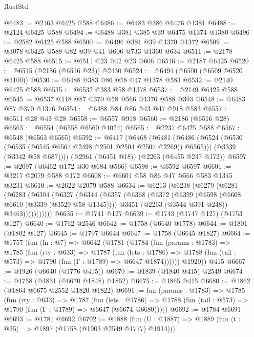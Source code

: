 \begin{lexlean}{RustStd}
\begin{coremodule}
{\begin{coremodule}
{{{{{{{{{{{{{{{@6483 := @2163 @6425 @588
@6486 := @6483 @386 @6476 @1381
@6488 := @2124 @6425 @588
@6494 := @6488 @381 @385 @39 @6475 @1374 @1380
@6496 := @2582 @6425 @588
@6500 := @6496 @381 @39 @1370 @1372
@6509 := @3078 @6425 @588 @82 @39 @41 @606 @733 @1360 @634
@6511 := @2178 @6425 @588
@6515 := @6511 @23 @42 @23 @606
@6516 := @2187 @6425
@6520 := @6515 (@2186 (@6516 @23)) @2430
@6524 := @6494 (@6500 (@6509 @6520 @3100))
@6530 := @6488 @383 @86 @58 @47 @1378 @583
@6532 := @2140 @6425 @588
@6535 := @6532 @383 @58 @1378
@6537 := @2149 @6425 @588
@6545 := @6537 @118 @87 @370 @58 @566 @1376 @588 @393
@6548 := @6483 @87 @370 @1376
@6554 := @6488 @84 @86 @43 @47 @918 @583
@6557 := @6511 @28 @43 @28
@6558 := @6557 @918
@6560 := @2186 (@6516 @28)
@6563 := @6554 (@6558 @6560 @4024)
@6565 := @2237 @6425 @588
@6567 := @6548 (@6563 @6565)
@6592 := @6417
    (@6468
      (@6481
        (@6486 (@6524 (@6530 (@6535 (@6545 @6567 @2498 @2501 @2504 @2507 @2269)) @6565)))
        (@3339 (@3342 @58 @687))))
    (@2961 (@6451 @18))
    (@2263 (@6455 @247 @172))
@6597 := @2097 (@6462 @172 @30 @684 @566)
@6598 := @6592 @6597
@6601 := @3217 @2079 @588 @172
@6608 := @6601 @58 @86 @47 @566 @583 @1345 @3231
@6610 := @2622 @2079 @588
@6634 := @6213
    (@6238
      (@6279
        (@6281
          (@6283
            (@6304
              (@6327
                (@6344
                  (@6357
                    (@6368
                      (@6372
                        (@6399
                          (@6598 (@6608 @6610 (@3339 (@3529 @58 @1345))))
                          @3451
                          (@2263 (@3544 @391 @248))
                          @3463)))))))))))
@6635 := @1741 @127
@6639 := @1743 (@1747 @127) (@1753 @127)
@6640 := @1762 @2546
@6642 := @1758 (@6640 @1778)
@6644 := @1801 (@1802 @127)
@6645 := @1797 @6644
@6647 := @1758 (@6645 @1827)
@6664 := @1757
    (fun (fn : @7) =>
    @6642
      (@1781
        (@1784
          (fun (params : @1783) =>
          @1785
            (fun (rty : @633) =>
            @1787
              (fun (lets : @1786) =>
              @1788 (fun (tail : @573) => @1790 (fun (Γ : @1789) => @6647 @1874))))))
        @1920))
    @415
@6667 := @1926 (@6640 (@1776 @415))
@6670 := @1839 (@1840 @415) @2549
@6674 := @1758 (@1831 (@6670 @1848) @1852)
@6675 := @1865 @415
@6680 := @1862 (@1864 @6675 @2552 @1820 @1822)
@6691 := fun (params : @1783) =>
  @1785
    (fun (rty : @633) =>
    @1787
      (fun (lets : @1786) =>
      @1788 (fun (tail : @573) => @1790 (fun (Γ : @1789) => @6647 (@6674 @6680)))))
@6692 := @1784 @6691
@6693 := @1781 @6692
@6702 := @1888 (fun (U : @1887) => @1889 (fun (t : @35) => @1897 (@1758 (@1903 @2549 @1777) @1914)))
}}}}}}}}}}}}}}}
\end{coremodule}}
\end{coremodule}
\end{lexlean}
